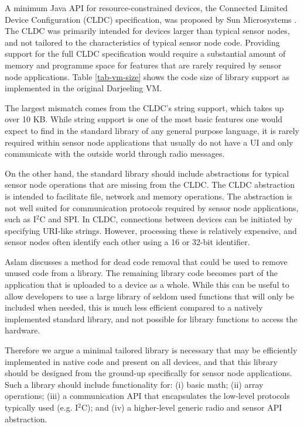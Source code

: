 A minimum Java API for resource-constrained devices, the Connected Limited Device Configuration (CLDC) specification, was proposed by Sun Microsystems \cite{CLDC}. The CLDC was primarily intended for devices larger than typical sensor nodes, and not tailored to the characteristics of typical sensor node code. Providing support for the full CLDC specification would require a substantial amount of memory and programme space for features that are rarely required by sensor node applications. Table \ref{tab-vm-size} shows the code size of library support as implemented in the original Darjeeling VM.

The largest mismatch comes from the CLDC's string support, which takes up over 10 KB. While string support is one of the most basic features one would expect to find in the standard library of any general purpose language, it is rarely required within sensor node applications that usually do not have a UI and only communicate with the outside world through radio messages.

On the other hand, the standard library should include abstractions for typical sensor node operations that are missing from the CLDC. The CLDC  abstraction is intended to facilitate file, network and memory operations. The abstraction is not well suited for communication protocols required by sensor node applications, such as I$^{2}$C and SPI. In CLDC, connections between devices can be initiated by specifying URI-like strings. However, processing these is relatively expensive, and sensor nodes often identify each other using a 16 or 32-bit identifier.

 

Aslam \cite{Aslam:2011thesis} discusses a method for dead code removal that could be used to remove unused code from a library. The remaining library code becomes part of the application that is uploaded to a device as a whole. While this can be useful to allow developers to use a large library of seldom used functions that will only be included when needed, this is much less efficient compared to a natively implemented standard library, and not possible for library functions to access the hardware.

Therefore we argue a minimal tailored library is necessary that may be efficiently implemented in native code and present on all devices, and that this library should be designed from the ground-up specifically for sensor node applications. Such a library should include functionality for: (i) basic math; (ii) array operations; (iii) a communication API that encapsulates the low-level protocols typically used (e.g. I$^{2}$C); and (iv) a higher-level generic radio and sensor API abstraction.


